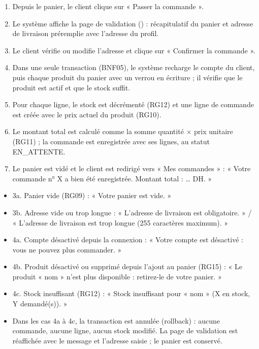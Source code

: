 \begin{enumerate}
  \item Depuis le panier, le client clique sur « Passer la commande ».
  \item Le système affiche la page de validation () : récapitulatif du panier
        et adresse de livraison préremplie avec l'adresse du profil.
  \item Le client vérifie ou modifie l'adresse et clique sur « Confirmer la commande ».
  \item Dans une seule transaction (BNF05), le système recharge le compte du client, puis chaque produit du
        panier avec un verrou en écriture ; il vérifie que le produit est actif et que le stock suffit.
  \item Pour chaque ligne, le stock est décrémenté (RG12) et une ligne de commande est créée avec le prix actuel
        du produit (RG10).
  \item Le montant total est calculé comme la somme quantité × prix unitaire (RG11) ; la commande est enregistrée
        avec ses lignes, au statut EN\_ATTENTE.
  \item Le panier est vidé et le client est redirigé vers « Mes commandes » : « Votre commande n° X a bien été
        enregistrée. Montant total : … DH. »
\end{enumerate}

\begin{itemize}
  \item 3a. Panier vide (RG09) : « Votre panier est vide. »
  \item 3b. Adresse vide ou trop longue : « L'adresse de livraison est obligatoire. » / « L'adresse de livraison est
        trop longue (255 caractères maximum). »
  \item 4a. Compte désactivé depuis la connexion : « Votre compte est désactivé : vous ne pouvez plus commander. »
  \item 4b. Produit désactivé ou supprimé depuis l'ajout au panier (RG15) : « Le produit « nom » n'est plus
        disponible : retirez-le de votre panier. »
  \item 4c. Stock insuffisant (RG12) : « Stock insuffisant pour « nom » (X en stock, Y demandé(s)). »
  \item Dans les cas 4a à 4c, la transaction est annulée (rollback) : aucune commande, aucune ligne, aucun stock
        modifié. La page de validation est réaffichée avec le message et l'adresse saisie ; le panier est conservé.
\end{itemize}

